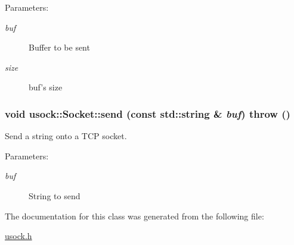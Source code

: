 \begin{Desc}
\item[Parameters:]
\begin{description}
\item[{\em buf}]Buffer to be sent \item[{\em size}]buf's size \end{description}
\end{Desc}
\hypertarget{classusock_1_1Socket_6aa18c3c0131c826afe790a4c8c7aa77}{
\subsubsection[{send}]{\setlength{\rightskip}{0pt plus 5cm}void usock::Socket::send (const std::string \& {\em buf})  throw ()}}
\label{classusock_1_1Socket_6aa18c3c0131c826afe790a4c8c7aa77}


Send a string onto a TCP socket. 

\begin{Desc}
\item[Parameters:]
\begin{description}
\item[{\em buf}]String to send \end{description}
\end{Desc}


The documentation for this class was generated from the following file:\begin{CompactItemize}
\item 
\hyperlink{usock_8h}{usock.h}\end{CompactItemize}
